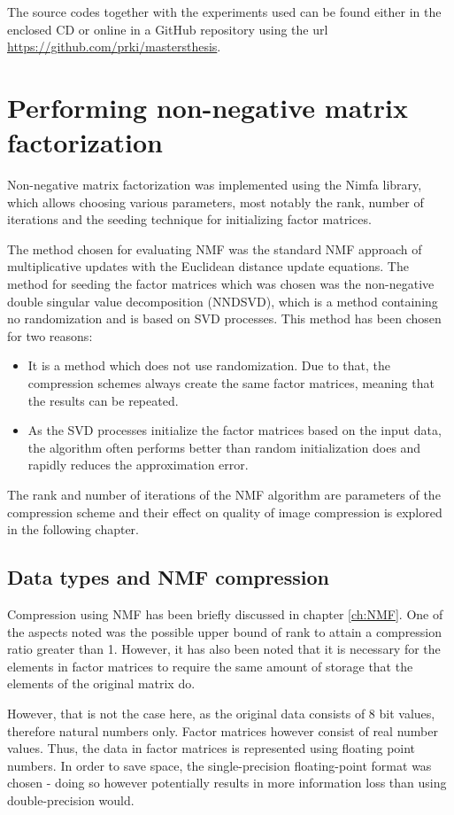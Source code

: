 \documentclass[thesis=M,english]{FITthesis}[2012/10/20]
\begin{document}
The source codes together with the experiments used can be found either in the enclosed
CD or online in a GitHub repository using the url \url{https://github.com/prki/mastersthesis}.

\section{Performing non-negative matrix factorization}
Non-negative matrix factorization was implemented using the Nimfa library, which
allows choosing various parameters, most notably the rank, number of iterations and
the seeding technique for initializing factor matrices.

The method chosen for evaluating NMF was the standard NMF approach of multiplicative
updates with the Euclidean distance update equations. The method for seeding
the factor matrices which was chosen was the non-negative double singular value
decomposition (NNDSVD)\cite{nndsvd}, which is a method containing no randomization
and is based on SVD processes. This method has been chosen for two reasons:
\begin{itemize}
  \item It is a method which does not use randomization. Due to that, the
  compression schemes always create the same factor matrices, meaning that the
  results can be repeated.
  \item As the SVD processes initialize the factor matrices based on the input
  data, the algorithm often performs better than random initialization does
  and rapidly reduces the approximation error.\cite{nndsvd}
\end{itemize}

The rank and number of iterations of the NMF algorithm are parameters of the
compression scheme and their effect on quality of image compression is explored
in the following chapter.


\subsection{Data types and NMF compression}
Compression using NMF has been briefly discussed in chapter \ref{ch:NMF}. One of
the aspects noted was the possible upper bound of rank to attain a compression ratio
greater than 1. However, it has also been noted that it is necessary for the elements
in factor matrices to require the same amount of storage that the elements of the
original matrix do.

However, that is not the case here, as the original data consists of 8 bit values,
therefore natural numbers only. Factor matrices however consist of real number
values. Thus, the data in factor matrices is represented using floating point
numbers. In order to save space, the single-precision floating-point format was
chosen - doing so however potentially results in more information loss than
using double-precision would.
\end{document}

